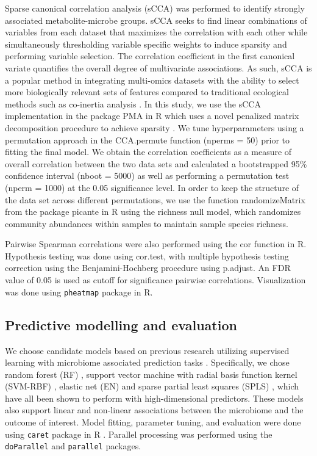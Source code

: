Sparse canonical correlation analysis (sCCA) was performed to identify strongly associated metabolite-microbe groups. sCCA seeks to find linear combinations of variables from each dataset that maximizes the correlation with each other while simultaneously thresholding variable specific weights to induce sparsity and performing variable selection. The correlation coefficient in the first canonical variate quantifies the overall degree of multivariate associations. As such, sCCA is a popular method in integrating multi-omics datasets with the ability to select more biologically relevant sets of features compared to traditional ecological methods such as co-inertia analysis \cite{cao2015sparse}. In this study, we use the sCCA implementation in the package PMA in R \cite{witten2019pma} which uses a novel penalized matrix decomposition procedure to achieve sparsity \cite{witten2009penalized}. We tune hyperparameters using a permutation approach in the CCA.permute function (nperms = 50) prior to fitting the final model. We obtain the correlation coefficients as a measure of overall correlation between the two data sets and calculated a bootstrapped 95\% confidence interval (nboot = 5000) as well as performing a permutation test (nperm = 1000) at the 0.05 significance level. In order to keep the structure of the data set across different permutations, we use the function randomizeMatrix from the package picante in R \cite{kembel2010picante} using the richness null model, which randomizes community abundances within samples to maintain sample species richness.  

Pairwise Spearman correlations were also performed using the cor function in R. Hypothesis testing was done using cor.test, with multiple hypothesis testing correction using the Benjamini-Hochberg procedure \cite{benjamini1995controlling} using p.adjust. An FDR value of 0.05 is used as cutoff for significance pairwise correlations. Visualization was done using \texttt{pheatmap} package in R.  

\subsection{Predictive modelling and evaluation}

We choose candidate models based on previous research utilizing supervised learning with microbiome associated prediction tasks \cite{zhou2019review, pasolli2016machine, mallick2019predictive}. Specifically, we chose random forest (RF) \cite{breiman2001random}, support vector machine with radial basis function kernel (SVM-RBF) \cite{boser1992training}, elastic net (EN) \cite{zou2005regularization} and sparse partial least squares (SPLS) \cite{chun2010sparse}, which have all been shown to perform with high-dimensional predictors. These models also support linear and non-linear associations between the microbiome and the outcome of interest. Model fitting, parameter tuning, and evaluation were done using \texttt{caret} package in R \cite{wing2019caret}. Parallel processing was performed using the \texttt{doParallel} \cite{corporation2019doparallel} and \texttt{parallel} packages. 

